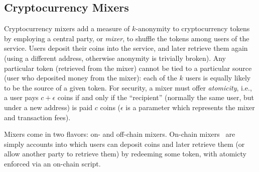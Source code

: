 \subsection{Cryptocurrency Mixers}


Cryptocurrency mixers add a measure of $k$-anonymity to cryptocurrency tokens by employing a central party, or \emph{mixer}, to shuffle the tokens among users of the service. Users deposit their coins into the service, and later retrieve them again (using a different address, otherwise anonymity is trivially broken).
Any particular token (retrieved from the mixer) cannot be tied to a particular source (user who deposited money from the mixer): each of the $k$ users is equally likely to be the source of a given token. For security, a mixer must offer \emph{atomicity}, i.e., a user pays $c+\epsilon$ coins if and only if the ``recipient'' (normally the same user, but under a new address) is paid $c$ coins ($\epsilon$ is a parameter which represents the mixer and transaction fees). 

Mixers come in two flavors: on- and off-chain mixers. On-chain mixers~\todo{\cite{}} are simply accounts into which users can deposit coins and later retrieve them (or allow another party to retrieve them) by redeeming some token, with atomicty enforced via an on-chain script. 

